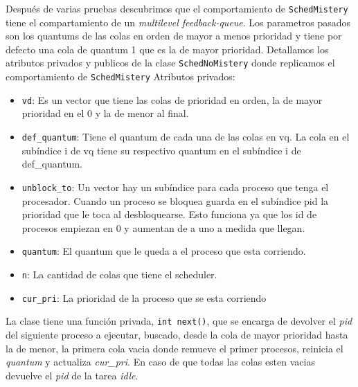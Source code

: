 Después de varias pruebas descubrimos que el comportamiento de \texttt{SchedMistery} tiene el compartamiento de un \emph{multilevel feedback-queue}. Los parametros pasados son los quantums de las colas en orden de mayor a menos prioridad y tiene por defecto una cola de quantum 1 que es la de mayor prioridad.
\newline Detallamos los atributos privados y publicos de la clase \texttt{SchedNoMistery} donde replicamos el comportamiento de \texttt{SchedMistery}
Atributos privados:
\begin{itemize}
	\item \texttt{vd}: Es un vector que tiene las colas de prioridad en orden, la de mayor prioridad en el 0 y la de menor al final.
	\item \texttt{def\_quantum}: Tiene el quantum de cada una de las colas en vq. La cola en el subíndice i de vq tiene su respectivo quantum en el subíndice i de def\_quantum. 
	\item \texttt{unblock\_to}: Un vector hay un subíndice para cada proceso que tenga el procesador. Cuando un proceso se bloquea guarda en el subíndice pid la prioridad que le toca al desbloquearse. Esto funciona ya que los id de procesos empiezan en 0 y aumentan de a uno a medida que llegan.
	\item \texttt{quantum}: El quantum que le queda a el proceso que esta corriendo.
	\item \texttt{n}: La  cantidad de colas que tiene el scheduler.
	\item \texttt{cur\_pri}: La prioridad de la proceso que se esta corriendo
\end{itemize}

La clase tiene una función privada, \texttt{int next()}, que se encarga de devolver el \emph{pid} del siguiente proceso a ejecutar, buscado, desde la cola de mayor prioridad hasta la de menor, la primera cola vacia donde remueve el primer procesos, reinicia el \emph{quantum} y actualiza \emph{cur\_pri}. En caso de que todas las colas esten vacias devuelve el \emph{pid} de la tarea \emph{idle}.

